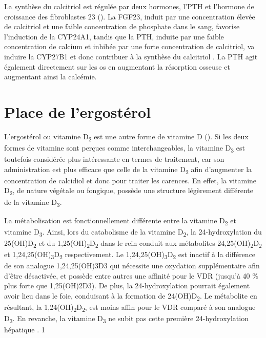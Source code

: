 \documentclass[
  a4paper,
  DIV=11,
  numbers=noendperiod,
  listof=totoc]{scrreprt}
\begin{document}
La synthèse du calcitriol est régulée par deux hormones, l'\acf{PTH} et
l'hormone de croissance des fibroblastes 23 (). La
\ac{FGF23}, induit par une concentration élevée de calcitriol et une
faible concentration de phosphate dans le sang, favorise l'induction de
la \ac{CYP24A1}, tandis que la \ac{PTH}, induite par une faible
concentration de calcium et inhibée par une forte concentration de
calcitriol, va induire la \ac{CYP27B1} et donc contribuer à la synthèse
du calcitriol \autocite{Dankers.2017,Christakos.2010}. La \ac{PTH} agit
également directement sur les os en augmentant la résorption osseuse et
augmentant ainsi la calcémie.

\section{Place de l'ergostérol}\label{place-de-lergostuxe9rol}

L'ergostérol ou vitamine D\textsubscript{2} est une autre forme de
vitamine D (). Si les deux formes de vitamine sont
perçues comme interchangeables, la vitamine D\textsubscript{3} est
toutefois considérée plus intéressante en termes de traitement, car son
administration est plus efficace que celle de la vitamine
D\textsubscript{2} afin d'augmenter la concentration de calcidiol et
donc pour traiter les carences. En effet, la vitamine
D\textsubscript{2}, de nature végétale ou fongique, possède une
structure légèrement différente de la vitamine D\textsubscript{3}.

La métabolisation est fonctionnellement différente entre la vitamine
D\textsubscript{2} et vitamine D\textsubscript{3}. Ainsi, lors du
catabolisme de la vitamine D\textsubscript{2}, la 24-hydroxylation du
25(OH)D\textsubscript{2} et du
1,25(OH)\textsubscript{2}D\textsubscript{2} dans le rein conduit aux
métabolites 24,25(OH)\textsubscript{2}D\textsubscript{2} et
1,24,25(OH)\textsubscript{3}D\textsubscript{2} respectivement. Le
1,24,25(OH)\textsubscript{3}D\textsubscript{2} est inactif à la
différence de son analogue \ac{1,24,25(OH)3D3} qui nécessite une
oxydation supplémentaire afin d'être désactivée, et possède entre autres
une affinité pour le \ac{VDR} (jusqu'à 40 \% plus forte que
\ac{1,25(OH)2D3}). De plus, la 24-hydroxylation pourrait également avoir
lieu dans le foie, conduisant à la formation de
24(OH)D\textsubscript{2}. Le métabolite en résultant, la
1,24(OH)\textsubscript{2}D\textsubscript{2}, est moins affin pour le
\ac{VDR} comparé à son analogue D\textsubscript{3}. En revanche, la
vitamine D\textsubscript{3} ne subit pas cette première 24-hydroxylation
hépatique \autocite{Houghton.2006}. 1
\end{document}
